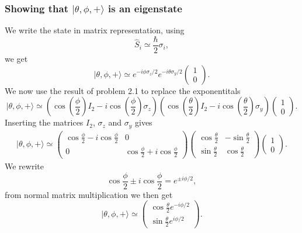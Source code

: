\documentclass[a4paper, 11pt, titlepage, english]{article}
\newcommand{\ket}[1]{|#1 \rangle}
\newcommand{\op}[1]{\hat{#1}}
\begin{document}
\subsubsection*{Showing that $\ket{\theta, \phi, +}$ is an eigenstate}
We write the state in matrix representation, using
$$\op{S}_i \simeq \frac{\hbar}{2}\sigma_i,$$
we get 
$$\ket{\theta, \phi, +} \simeq e^{-i\phi\sigma_z/2}e^{-i\theta\sigma_y/2}\begin{pmatrix} 1 \\ 0 \end{pmatrix}. $$
We now use the result of problem 2.1 to replace the exponentitals
$$\ket{\theta, \phi, +} \simeq \left(\cos\left(\frac{\phi}{2}\right)I_2 - i\cos\left(\frac{\phi}{2}\right)\sigma_z\right)\left(\cos\left(\frac{\theta}{2}\right)I_2 - i\cos\left(\frac{\theta}{2}\right)\sigma_y\right)
\begin{pmatrix} 1 \\ 0 \end{pmatrix}.$$
Inserting the matrices $I_2$, $\sigma_z$ and $\sigma_y$ gives
\begin{align*}
\ket{\theta, \phi, +} \simeq 
\begin{pmatrix}
\cos\frac{\phi}{2}-i\cos\frac{\phi}{2} & 0 \\
0 & \cos\frac{\phi}{2}+i\cos\frac{\phi}{2}
\end{pmatrix}
\begin{pmatrix}
\cos\frac{\theta}{2} & -\sin\frac{\theta}{2} \\[0.4cm]
\sin\frac{\theta}{2} & \cos\frac{\theta}{2}
\end{pmatrix} 
\begin{pmatrix} 1 \\ 0 \end{pmatrix}.
\end{align*}
We rewrite
$$\cos\frac{\phi}{2}\pm i\cos\frac{\phi}{2} = e^{\pm i\phi/2},$$
from normal matrix multiplication we then get
$$\ket{\theta, \phi, +} \simeq \begin{pmatrix}
\cos\frac{\theta}{2}e^{-i\phi/2} \\[0.4cm]
 \sin{\frac{\theta}{2}}e^{i\phi/2}
\end{pmatrix}.$$
\end{document}
